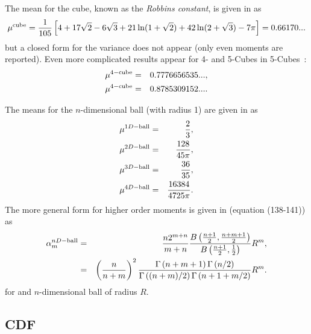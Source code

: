 \documentclass{article}
\begin{document}
The mean for the cube, known as the {\em Robbins constant}, is given
in \cite{robbins78:_constant,weisstein:_cube_line_picking} as
\begin{equation}
   \label{eq:cube_mean}
 \mu^{\rm cube} = \frac{1}{105} \left[ 
                             4 + 17 \sqrt{2}- 6 \sqrt{3}  +
                             21 \ln(1+\sqrt{2}) + 
                             42 \ln(2+\sqrt{3}) - 7 \pi
                      \right]
	=	0.66170...
\end{equation}
but a closed form for the variance does not appear (only even moments
are reported). Even more complicated results appear for 4- and 5-Cubes in
5-Cubes~\cite{philip:_probab_distr_distan_between_two_4d}:
\begin{eqnarray}
 \mu^{\rm 4-cube} & = & 0.7776656535 ...    \label{eq:4-cube}, \\
 \mu^{\rm 4-cube} & = & 0.8785309152 ...     \label{eq:5-cube}.
\end{eqnarray}

The means for the $n$-dimensional ball (with radius 1) are given in
\cite{weisstein:_ball_line_picking} as
\begin{eqnarray}
  \label{eq:ball-ndim-mean}
  \mu^{1D-{\rm ball}} & = & \frac{2}{3}, \\
  \mu^{2D-{\rm ball}} & = & \frac{128}{45 \pi},\\
  \mu^{3D-{\rm ball}} & = & \frac{36}{35}, \\
  \mu^{4D-{\rm ball}} & = & \frac{16384}{4725 \pi}.
\end{eqnarray}
The more general form for higher order moments is given in
\cite{tu00:_circle_line} (equation (138-141)) as
\begin{eqnarray}
  \label{eq:ball-ndim-moments}
  \alpha_m^{nD-{\rm ball}} & = &
     \frac{n 2^{m+n}}{m+n} \frac{B\left(\frac{n+1}{2}, \frac{n+m+1}{2}  \right)}{B\left(\frac{n+1}{2}, \frac{1}{2} \right)} R^m, \\
       & = & \left( \frac{n}{n+m} \right)^2 
                 \frac{\Gamma\left( n+m+1 \right) \Gamma\left( n/2 \right) }
                      {\Gamma\left( (n+m)/2 \right) \Gamma\left( n+1 + m/2 \right) } R^m.  
\end{eqnarray}
for and $n$-dimensional ball of radius $R$.



\subsection{CDF}
\end{document}

